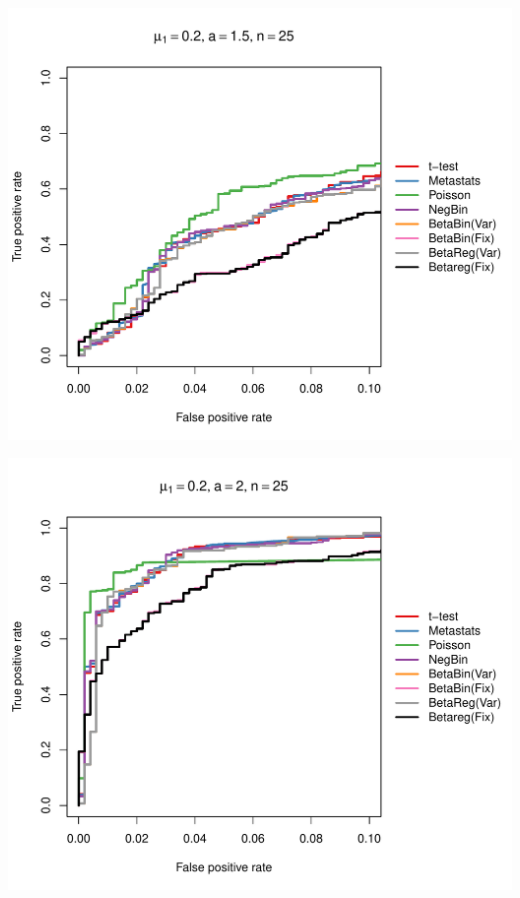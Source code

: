 \documentclass[12pt]{article}\usepackage{graphicx, color}
\makeatletter
\def\maxwidth{ %
  \ifdim\Gin@nat@width>\linewidth
    \linewidth
  \else
    \Gin@nat@width
  \fi
}
\newenvironment{knitrout}{}{} %
\makeatother
\begin{document}
\begin{knitrout}
{\centering \includegraphics[width=\maxwidth]{figure/rocs61} 

}




{\centering \includegraphics[width=\maxwidth]{figure/rocs62} 

}





\end{knitrout}
\end{document}
